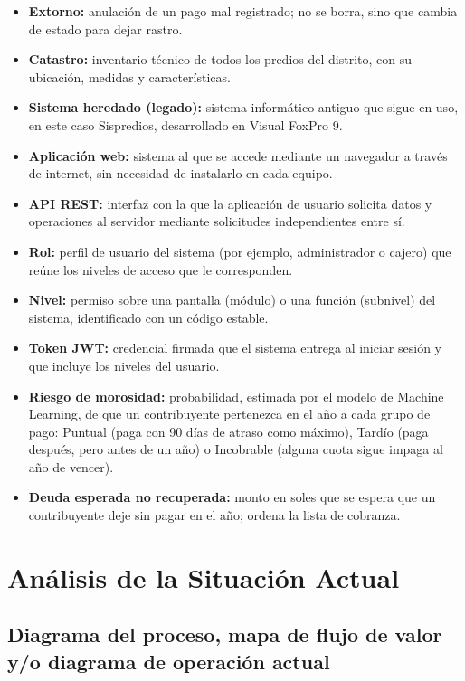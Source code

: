 \documentclass[12pt,a4paper]{report}
\begin{document}
\begin{itemize}[leftmargin=1.25cm,itemsep=0pt,topsep=0pt]
  \item \textbf{Extorno:} anulación de un pago mal registrado; no se borra, sino que cambia de estado para dejar rastro.
  \item \textbf{Catastro:} inventario técnico de todos los predios del distrito, con su ubicación, medidas y características.
  \item \textbf{Sistema heredado (legado):} sistema informático antiguo que sigue en uso, en este caso Sispredios, desarrollado en Visual FoxPro 9.
  \item \textbf{Aplicación web:} sistema al que se accede mediante un navegador a través de internet, sin necesidad de instalarlo en cada equipo.
  \item \textbf{API REST:} interfaz con la que la aplicación de usuario solicita datos y operaciones al servidor mediante solicitudes independientes entre sí.
  \item \textbf{Rol:} perfil de usuario del sistema (por ejemplo, administrador o cajero) que reúne los niveles de acceso que le corresponden.
  \item \textbf{Nivel:} permiso sobre una pantalla (módulo) o una función (subnivel) del sistema, identificado con un código estable.
  \item \textbf{Token JWT:} credencial firmada que el sistema entrega al iniciar sesión y que incluye los niveles del usuario.
  \item \textbf{Riesgo de morosidad:} probabilidad, estimada por el modelo de Machine Learning, de que un contribuyente pertenezca en el año a cada grupo de pago: Puntual (paga con 90 días de atraso como máximo), Tardío (paga después, pero antes de un año) o Incobrable (alguna cuota sigue impaga al año de vencer).
  \item \textbf{Deuda esperada no recuperada:} monto en soles que se espera que un contribuyente deje sin pagar en el año; ordena la lista de cobranza.
\end{itemize}

\chapter{Análisis de la Situación Actual}

\section{Diagrama del proceso, mapa de flujo de valor y/o diagrama de operación actual}
\end{document}
